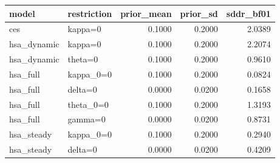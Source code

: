 \begin{tabular}{llrrr}
\toprule
model & restriction & prior\_mean & prior\_sd & sddr\_bf01 \\
\midrule
ces & kappa=0 & 0.1000 & 0.2000 & 2.0389 \\
hsa\_dynamic & kappa=0 & 0.1000 & 0.2000 & 2.2074 \\
hsa\_dynamic & theta=0 & 0.1000 & 0.2000 & 0.9610 \\
hsa\_full & kappa\_0=0 & 0.1000 & 0.2000 & 0.0824 \\
hsa\_full & delta=0 & 0.0000 & 0.0200 & 0.1658 \\
hsa\_full & theta\_0=0 & 0.1000 & 0.2000 & 1.3193 \\
hsa\_full & gamma=0 & 0.0000 & 0.0200 & 0.8731 \\
hsa\_steady & kappa\_0=0 & 0.1000 & 0.2000 & 0.2940 \\
hsa\_steady & delta=0 & 0.0000 & 0.0200 & 0.4209 \\
\bottomrule
\end{tabular}
